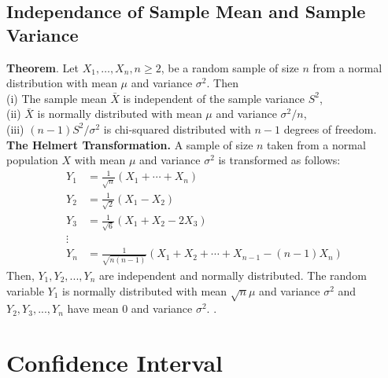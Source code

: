 \documentclass[a4paper,12pt]{article}
\begin{document}
\subsection{Independance of Sample Mean and Sample Variance}
\textbf{Theorem}. Let $X_1, \ldots, X_n, n \geq 2$, be a random sample of size $n$ from a normal distribution with mean $\mu$ and variance $\sigma^2$. Then\\
(i) The sample mean $\bar{X}$ is independent of the sample variance $S^2$,\\
(ii) $\bar{X}$ is normally distributed with mean $\mu$ and variance $\sigma^2 / n$,\\
(iii) $(n-1) S^2 / \sigma^2$ is chi-squared distributed with $n-1$ degrees of freedom.\\
\textbf{The Helmert Transformation.} A sample of size $n$ taken from a normal population $X$ with mean $\mu$ and variance $\sigma^2$ is transformed as follows:
$$
\begin{aligned}
Y_1 & =\frac{1}{\sqrt{n}}\left(X_1+\cdots+X_n\right) \\
Y_2 & =\frac{1}{\sqrt{2}}\left(X_1-X_2\right) \\
Y_3 & =\frac{1}{\sqrt{6}}\left(X_1+X_2-2 X_3\right) \\
\vdots & \\
Y_n & =\frac{1}{\sqrt{n(n-1)}}\left(X_1+X_2+\cdots+X_{n-1}-(n-1) X_n\right)
\end{aligned}
$$
Then, $Y_1, Y_2,...,Y_n$ are independent and normally distributed. The random variable $Y_1$ is normally distributed with mean $\sqrt{n}\mu$ and variance $\sigma^2$ and $Y_2, Y_3,...,Y_n$ have mean $0$ and variance $\sigma^2$.
.


\section{Confidence Interval}
\end{document}
